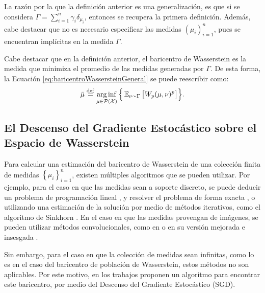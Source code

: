La razón por la que la definición anterior es una generalización, es que si se considera $\Gamma = \sum_{i=1}^{n} \gamma_i \delta_{\mu_i}$, entonces se recupera la primera definición. Además, cabe destacar que no es necesario especificar las medidas $(\mu_i)_{i=1}^{n}$, pues se encuentran implícitas en la medida $\Gamma$.

\begin{remark}
    Cabe destacar que en la definición anterior, el baricentro de Wasserstein es la medida que minimiza el promedio de las medidas generadas por $\Gamma$. De esta forma, la Ecuación \eqref{eq:baricentroWassersteinGeneral} se puede reescribir como:
    \begin{equation}
        \bar \mu \eqdef \arginf_{\mu \in \ProbSpace} \Big\{ \Exp_{\nu \sim \Gamma} \big[ \Wasserstein[p]{\mu}{\nu}^p \big] \Big\}.
    \end{equation}

\end{remark}

\subsection{El Descenso del Gradiente Estocástico sobre el Espacio de Wasserstein}\label{ssec:sgdw}  %

Para calcular una estimación del baricentro de Wasserstein de una colección finita de medidas $\left\{ \mu_i \right\}_{i=1}^{n}$, existen múltiples algoritmos que se pueden utilizar. Por ejemplo, para el caso en que las medidas sean a soporte discreto, se puede deducir un problema de programación lineal \cite[ver Cap. 3]{peyre2019computational}, y resolver el problema de forma exacta \cite{bonneel2011displacement}, o utilizando una estimación de la solución por medio de métodos iterativos, como el algoritmo de Sinkhorn \cite{cuturi2013sinkhorn}. En el caso en que las medidas provengan de imágenes, se pueden utilizar métodos convolucionales, como en \cite{solomon2015convolutional} o en su versión mejorada e insesgada \cite{janati2020debiased}.

Sin embargo, para el caso en que la colección de medidas sean infinitas, como lo es en el caso del baricentro de población de Wasserstein, estos métodos no son aplicables. Por este motivo, en los trabajos \cite{rios2020contributions,backhoff2022stochastic,backhoff2022bayesian} proponen un algoritmo para encontrar este baricentro, por medio del Descenso del Gradiente Estocástico (SGD).

